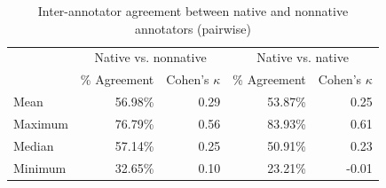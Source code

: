 		
		\begin{table}[tb]
			\centering
			\caption{Inter-annotator agreement between native and nonnative annotators (pairwise)}
			\begin{tabular}{lrrrr}
			\toprule
			& \multicolumn{2}{c}{Native vs. nonnative} & \multicolumn{2}{c}{Native vs. native} \\
			\cmidrule(lr){2-3} \cmidrule(lr){4-5}
			& \% Agreement & Cohen's $\kappa$ & \% Agreement & Cohen's $\kappa$  \\
			\midrule
Mean	&56.98\%	 & 0.29  & 53.87\%	& 0.25\\
Maximum&	76.79\%	& 0.56 & 83.93\%	 & 0.61\\
Median	& 57.14\%	 &0.25 &  50.91\%	& 0.23 \\
Minimum	&32.65\%	 & 0.10 &  23.21\% &	-0.01\\
			\bottomrule
			\end{tabular}
			\label{tab:agreement:L1}
		\end{table} 
		
